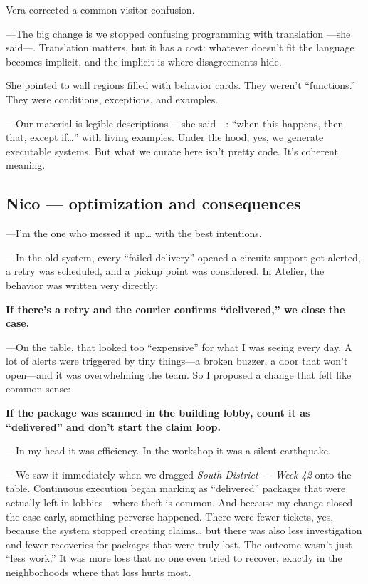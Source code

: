 \documentclass[11pt,a4paper]{article}
\begin{document}
Vera corrected a common visitor confusion.

---The big change is we stopped confusing programming with translation ---she
said---. Translation matters, but it has a cost: whatever doesn't fit the
language becomes implicit, and the implicit is where disagreements hide.

She pointed to wall regions filled with behavior cards. They weren't
``functions.'' They were conditions, exceptions, and examples.

---Our material is legible descriptions ---she said---: ``when this happens,
then that, except if\ldots'' with living examples. Under the hood, yes, we
generate executable systems. But what we curate here isn't pretty code. It's
coherent meaning.

\subsection{Nico --- optimization and consequences}

---I'm the one who messed it up\ldots{} with the best intentions.

---In the old system, every ``failed delivery'' opened a circuit: support got
alerted, a retry was scheduled, and a pickup point was considered. In
Atelier, the behavior was written very directly:

\begin{center}
\textbf{If there's a retry and the courier confirms ``delivered,'' we close
the case.}
\end{center}

---On the table, that looked too ``expensive'' for what I was seeing every
day. A lot of alerts were triggered by tiny things---a broken buzzer, a door
that won't open---and it was overwhelming the team. So I proposed a change
that felt like common sense:

\begin{center}
\textbf{If the package was scanned in the building lobby, count it as
``delivered'' and don't start the claim loop.}
\end{center}

---In my head it was efficiency. In the workshop it was a silent earthquake.

---We saw it immediately when we dragged \emph{South District --- Week 42}
onto the table. Continuous execution began marking as ``delivered'' packages
that were actually left in lobbies---where theft is common. And because my
change closed the case early, something perverse happened. There were fewer
tickets, yes, because the system stopped creating claims\ldots{} but there
was also less investigation and fewer recoveries for packages that were truly
lost. The outcome wasn't just ``less work.'' It was more loss that no one
even tried to recover, exactly in the neighborhoods where that loss hurts
most.
\end{document}
